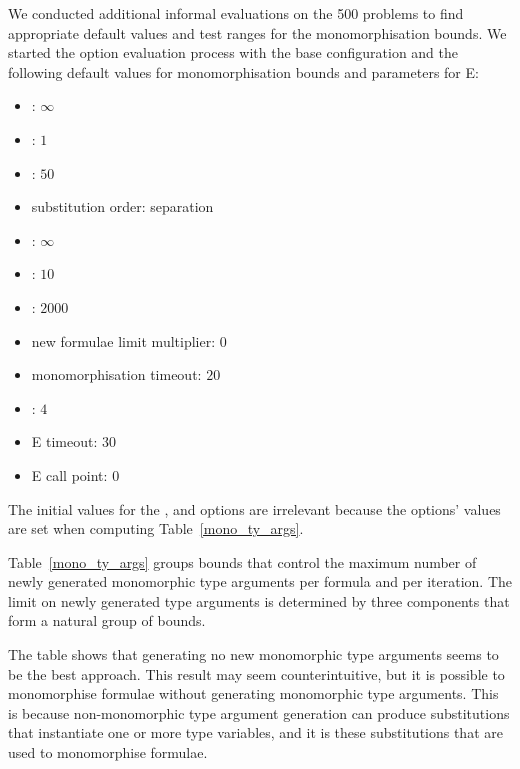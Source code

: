 \documentclass[runningheads]{llncs}
\begin{document}
We conducted additional informal evaluations on the 500 problems to find appropriate default values and test ranges for the monomorphisation bounds. We started the option evaluation process with the base configuration and the following default values for monomorphisation bounds and parameters for E:
%
\begin{minipage}[t]{.5\textwidth}
\topsep

\begin{itemize}
   \item \PolyCap: \(\infty\)
   \item \PolyMult: \(1\)
   \item \PolyFloor: \(50\)
   \item substitution order: separation
   \item \SubstLimit: \(\infty\)
   \item \MonoSubstsLimit: \(10\)
\end{itemize}

\topsep
\end{minipage}\begin{minipage}[t]{.5\textwidth}
\topsep

\begin{itemize}
   \item \Limit: \(2000\)
   \item new formulae limit multiplier: \(0\)
   \item monomorphisation timeout: \(20\)
   \item \Loop: \(4\)
   \item E timeout: \(30\)
   \item E call point: \(0\)
\end{itemize}

\topsep
\end{minipage}
%
The initial values for the \MonoCap, \MonoMult and \MonoFloor options are irrelevant because the options' values are set when computing Table~\ref{mono_ty_args}.%

Table~\ref{mono_ty_args} groups bounds that control the maximum number of newly generated monomorphic type arguments per formula and per iteration. The limit on newly generated type arguments is determined by three components that form a natural group of bounds.

The table shows that generating no new monomorphic type arguments seems to be the best approach. This result may seem counterintuitive, but it is possible to monomorphise formulae without generating monomorphic type arguments. This is because non-monomorphic type argument generation can produce substitutions that instantiate one or more type variables, and it is these substitutions that are used to monomorphise formulae.
\end{document}
